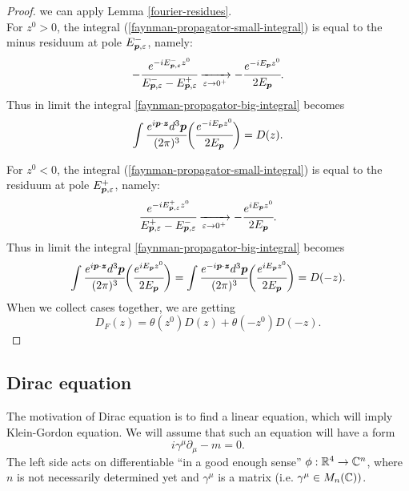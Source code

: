 \documentclass[main.tex]{subfiles}
\begin{document}
\begin{proof}
we can apply Lemma \ref{fourier-residues}.\\
For $z^0 > 0$, the integral (\ref{faynman-propagator-small-integral}) is equal to the minus residuum at pole $E^{-}_{\boldsymbol{p},  \varepsilon}$, namely:
\begin{equation}
-\cfrac{e^{-i E^{-}_{\boldsymbol{p},  \varepsilon} z^0}}{E^{-}_{\boldsymbol{p},  \varepsilon} - E^{+}_{\boldsymbol{p},  \varepsilon}} \xrightarrow[\varepsilon \to 0^+]{} - \cfrac{e^{-i E_{\boldsymbol{p}} z^0}}{2E_{\boldsymbol{p}}}.
\end{equation}
Thus in limit the integral \ref{faynman-propagator-big-integral} becomes
\begin{equation}
\int \cfrac{e^{i\boldsymbol{p}\cdot\boldsymbol{z}}d^3 \boldsymbol{p}}{(2\pi)^3}
\bigg( \cfrac{e^{-i E_{\boldsymbol{p}}z^0 }}{2E_{\boldsymbol{p}}} \bigg) = D(z).
\end{equation}


For $z^0 < 0$, the integral (\ref{faynman-propagator-small-integral}) is equal to the residuum at pole $E^{+}_{\boldsymbol{p},  \varepsilon}$, namely:
\begin{equation}
\cfrac{e^{-i E^{+}_{\boldsymbol{p},  \varepsilon} z^0}}{E^{+}_{\boldsymbol{p},  \varepsilon} - E^{-}_{\boldsymbol{p},  \varepsilon}} \xrightarrow[\varepsilon \to 0^+]{} -\cfrac{e^{i E_{\boldsymbol{p}} z^0}}{2E_{\boldsymbol{p}}}.
\end{equation}
Thus in limit the integral \ref{faynman-propagator-big-integral} becomes
\begin{equation}
\int \cfrac{e^{i\boldsymbol{p}\cdot\boldsymbol{z}}d^3 \boldsymbol{p}}{(2\pi)^3}
\bigg( \cfrac{e^{i E_{\boldsymbol{p}}z^0 }}{2E_{\boldsymbol{p}}} \bigg) = 
\int \cfrac{e^{-i\boldsymbol{p}\cdot\boldsymbol{z}}d^3 \boldsymbol{p}}{(2\pi)^3}
\bigg( \cfrac{e^{i E_{\boldsymbol{p}}z^0 }}{2E_{\boldsymbol{p}}} \bigg) = D(-z).
\end{equation}
When we collect cases together, we are getting
\begin{equation}
D_F(z) = \theta(z^0)D(z) + \theta(-z^0)D(-z). 
\end{equation}
\end{proof}

\subsection{Dirac equation}

The motivation of Dirac equation is to find a linear equation, which will imply Klein-Gordon equation. We will assume that such an equation will have a form
\begin{equation}
i\gamma^\mu \partial_\mu - m = 0.
\end{equation}
The left side acts on differentiable ``in a good enough sense'' $\phi:\mathbb{R}^4 \to \mathbb{C}^n$, where $n$ is not necessarily determined yet and $\gamma^\mu$ is a matrix (i.e. $\gamma^\mu\in M_n(\mathbb{C}))$.
\end{document}
